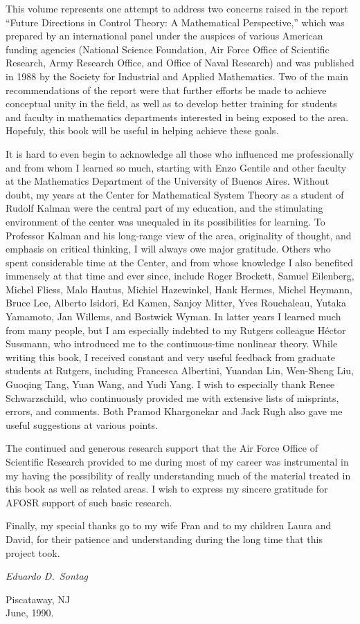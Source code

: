 This volume represents one attempt to address two concerns raised in the
report ``Future Directions in Control Theory: A Mathematical Perspective,''
which was prepared by an international panel under the auspices of various
American funding agencies (National Science Foundation, Air Force Office of
Scientific Research, Army Research Office, and Office of Naval Research) and
was published in 1988 by the Society for Industrial and Applied Mathematics.
Two of the main recommendations of the report were that further efforts be
made to achieve conceptual unity in the field, as well as to develop better
training for students and faculty in mathematics departments interested in
being exposed to the area.  Hopefuly, this book will be useful in helping
achieve these goals.

It is hard to even begin to acknowledge all those who influenced me
professionally and from whom I learned so much, starting with Enzo Gentile and
other faculty at the Mathematics Department of the University of Buenos Aires.
Without doubt, my years at the Center for Mathematical System Theory as a
student of Rudolf Kalman were the central part of my education, and the
stimulating environment of the center was unequaled in its possibilities for
learning.  To Professor Kalman and his long-range view of the area,
originality of thought, and emphasis on critical thinking, I will always owe
major gratitude.  Others who spent considerable time at the Center, and from
whose knowledge I also benefited immensely at that time and ever since,
include Roger Brockett, Samuel Eilenberg,
Michel Fliess, Malo Hautus, Michiel Hazewinkel, Hank Hermes, Michel Heymann,
Bruce Lee, Alberto Isidori, Ed Kamen, Sanjoy Mitter, Yves Rouchaleau, Yutaka
Yamamoto, Jan Willems, and Bostwick Wyman.  In latter years I learned much
from many people, but I am especially indebted to my Rutgers colleague H\'ector
Sussmann, who introduced me to the continuous-time nonlinear theory.  While
writing this book, I received constant and very useful feedback from graduate
students at Rutgers, including Francesca Albertini, Yuandan Lin, Wen-Sheng
Liu, Guoqing Tang, Yuan Wang, and Yudi Yang.  I wish to especially thank Renee
Schwarzschild, who continuously provided me with extensive lists of misprints,
errors, and comments.  Both Pramod Khargonekar and Jack Rugh also gave me
useful suggestions at various points.

The continued and generous research support that the Air Force Office of
Scientific Research provided to me during most of my career was instrumental
in my having the possibility of really understanding much of the material
treated in this book as well as related areas.  I wish to express my sincere
gratitude for AFOSR support of such basic research.

Finally, my special thanks go to my wife Fran and to my children Laura and
David, for their patience and understanding during the long time that this
project took.

\begin{flushright}
{\it Eduardo D.\ Sontag}
\end{flushright}
\begin{flushleft}
Piscataway, NJ\\
June, 1990.
\end{flushleft}



